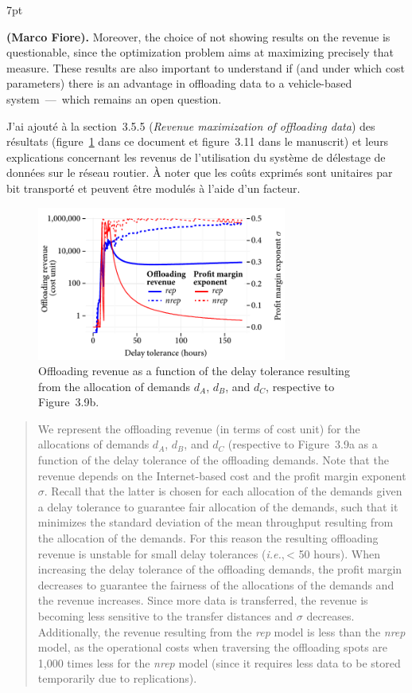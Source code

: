 \documentclass[11pt]{article}
\newcommand{\ie}{\textit{i.e.},\,}
\newenvironment{formal}{%
  \vspace*{-5pt}
  \def\FrameCommand{%
    \hspace{-5pt}%
    {\color{gray50}\vrule width 1.25pt}%
    \colorbox{formalcolor}%
  }%
  \MakeFramed{\advance\hsize-\width\FrameRestore}%
  \noindent\hspace{-4.55pt}%
  \begin{adjustwidth}{}{7pt}%
  \normalsize
  \vspace{-2pt}
}
{%
  \vspace{2pt}\end{adjustwidth}\endMakeFramed%
  \vspace*{-10pt}
}
\begin{document}
\begin{formal}
\textbf{(Marco Fiore).} Moreover, the choice of not showing results on the revenue is questionable, since the optimization problem aims at maximizing precisely that measure. These results are also important to understand if (and under which cost parameters) there is an advantage in offloading data to a vehicle-based system~---~which remains an open question.
\end{formal}

J'ai ajouté à la section~3.5.5 (\textit{Revenue maximization of offloading data}) des résultats (figure~\ref{fig:revenue-delay-tolerance} dans ce document et figure~3.11 dans le manuscrit) et leurs explications concernant les revenus de l'utilisation du système de délestage de données sur le réseau routier. À noter que les coûts exprimés sont unitaires par bit transporté et peuvent être modulés à l'aide d'un facteur. 

\begin{figure}[h!]
\centering
    \includegraphics[width=8.2cm]{results/revenue-delaytolerance.pdf}
    \caption{Offloading revenue as a function of the delay tolerance resulting from the allocation of demands $d_A$, $d_B$, and $d_C$, respective to Figure~3.9b.}
    \label{fig:revenue-delay-tolerance}
\end{figure}

\begin{quote}
We represent the offloading revenue (in terms of cost unit) for the allocations of demands $d_A$, $d_B$, and $d_C$ (respective to Figure~3.9a as a function of the delay tolerance of the offloading demands. Note that the revenue depends on the Internet-based cost and the profit margin exponent $\sigma$. Recall that the latter is chosen for each allocation of the demands given a delay tolerance to guarantee fair allocation of the demands, such that it minimizes the standard deviation of the mean throughput resulting from the allocation of the demands. For this reason the resulting offloading revenue is unstable for small delay tolerances (\ie < 50 hours). When increasing the delay tolerance of the offloading demands, the profit margin decreases to guarantee the fairness of the allocations of the demands and the revenue increases. Since more data is transferred, the revenue is becoming less sensitive to the transfer distances and $\sigma$ decreases. Additionally, the revenue resulting from the \textit{rep} model is less than the \textit{nrep} model, as the operational costs when traversing the offloading spots are 1,000 times less for the \textit{nrep} model (since it requires less data to be stored temporarily due to replications).
\end{quote}
\end{document}
